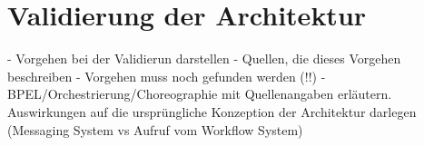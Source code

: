 \chapter{Validierung der Architektur} %
\label{cha:validierung_der_architektur}

- Vorgehen bei der Validierun darstellen
- Quellen, die dieses Vorgehen beschreiben
- Vorgehen muss noch gefunden werden (!!)
- BPEL/Orchestrierung/Choreographie mit Quellenangaben erläutern. Auswirkungen auf die ursprüngliche Konzeption der Architektur darlegen (Messaging System vs Aufruf vom Workflow System)

